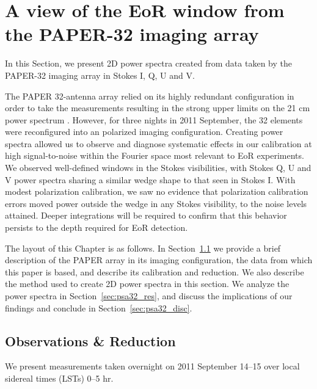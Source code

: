 \chapter{A view of the EoR window from the PAPER-32 imaging array}
\label{chapter:eor_window_paper32img}

In this Section, we present 2D power spectra created from data taken by the PAPER-32 imaging array in Stokes I, Q, U and V. 

The PAPER 32-antenna array relied on its highly redundant configuration in order to take the measurements resulting in the strong upper limits on the 21 cm power spectrum \citep{Parsons.14, Jacobs.15, Moore.17}. However, for three nights in 2011 September, the 32 elements were reconfigured into an polarized imaging configuration. 
Creating power spectra allowed us to observe and diagnose systematic effects in our calibration at high signal-to-noise within the Fourier space most relevant to EoR experiments. We observed well-defined windows in the Stokes visibilities, with Stokes Q, U and V power spectra sharing a similar wedge shape to that seen in Stokes I.  With modest polarization calibration, we saw no evidence that polarization calibration errors moved power outside the wedge in any Stokes visibility, to the noise levels attained. Deeper integrations will be required to confirm that this behavior persists to the depth required for EoR detection.

The layout of this Chapter is as follows.  In Section~\ref{sec:psa32_obs} we provide a brief description of the PAPER array in its imaging configuration, the data from which this paper is based, and describe its calibration and reduction. We also describe the method used to create 2D power spectra in this section. We analyze the power spectra in Section~\ref{sec:psa32_res}, and discuss the implications of our findings and conclude in Section~\ref{sec:psa32_disc}.

\section{Observations \& Reduction}
\label{sec:psa32_obs}
We present measurements taken overnight on 2011 September 14--15 over local sidereal times (LSTs) 0--5 hr.

